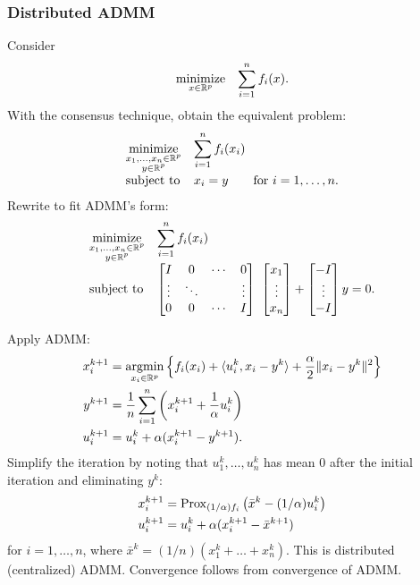 \documentclass[10pt,mathserif]{beamer}
\begin{document}
\begin{frame}[plain]
\frametitle{Distributed ADMM}
Consider
\[
\begin{array}{ll}
\underset{x\in\mathbb{R}^p}{\mbox{minimize}} &\displaystyle{\sum_{i=1}^n f_i(x)}.
\end{array}
\]
With the consensus technique, obtain the equivalent problem:
\[
\begin{array}{ll}
\underset{\substack{x_1,\dots,x_n\in\mathbb{R}^p\\y\in \mathbb{R}^p}}{\mbox{minimize}} &\displaystyle{\sum_{i=1}^n f_i(x_i)}\\
\mbox{subject to}& x_i=y\qquad\text{for } i=1,\dots,n.
\end{array}
\]
Rewrite to fit ADMM's form:
\[
\begin{array}{ll}
\underset{\substack{x_1,\dots,x_n\in \mathbb{R}^p\\y\in \mathbb{R}^p}}{\mbox{minimize}} &\displaystyle{\sum_{i=1}^n f_i(x_i)}\\
\mbox{subject to}&
\begin{bmatrix}
I&0&\cdots&0\\
\vdots&\ddots&&\vdots\\
0&0&\cdots&I\\
\end{bmatrix}\
\begin{bmatrix}
x_1\\\vdots\\x_n
\end{bmatrix}
+
\begin{bmatrix}
-I\\
\vdots\\
-I
\end{bmatrix}
y
=0.
\end{array}
\]
\end{frame}


\begin{frame}
Apply ADMM:
\begin{align*}
x_i^{k+1}&=\operatorname*{argmin}_{x_i\in \mathbb{R}^p}\left\{f_i(x_i)+\langle u^k_i,x_i-y^k\rangle+\frac{\alpha}{2}\|x_i-y^k\|^2\right\}\\
y^{k+1}&=\frac{1}{n}\sum^n_{i=1}\left(x_i^{k+1}+\frac{1}{\alpha}u_i^k\right)\\
u_i^{k+1}&=u^k_i+\alpha(x_i^{k+1}-y^{k+1}).
\end{align*}
Simplify the iteration by noting that $u^k_1,\dots,u^k_n$ has mean $0$ after the initial iteration and eliminating $y^k$:
\begin{align*}
x_i^{k+1}&=\mathrm{Prox}_{(1/\alpha)f_i}\left(\bar{x}^{k}-(1/\alpha)u^k_i\right)\\
u_i^{k+1}&=u^k_i+\alpha(x_i^{k+1}-\bar{x}^{k+1})
\end{align*}
for $i=1,\dots,n$,
where $\bar{x}^{k}=(1/n)(x_1^k+\dots+x_n^k)$.
This is distributed (centralized) ADMM.
Convergence follows from convergence of ADMM.
\end{frame}
\end{document}
